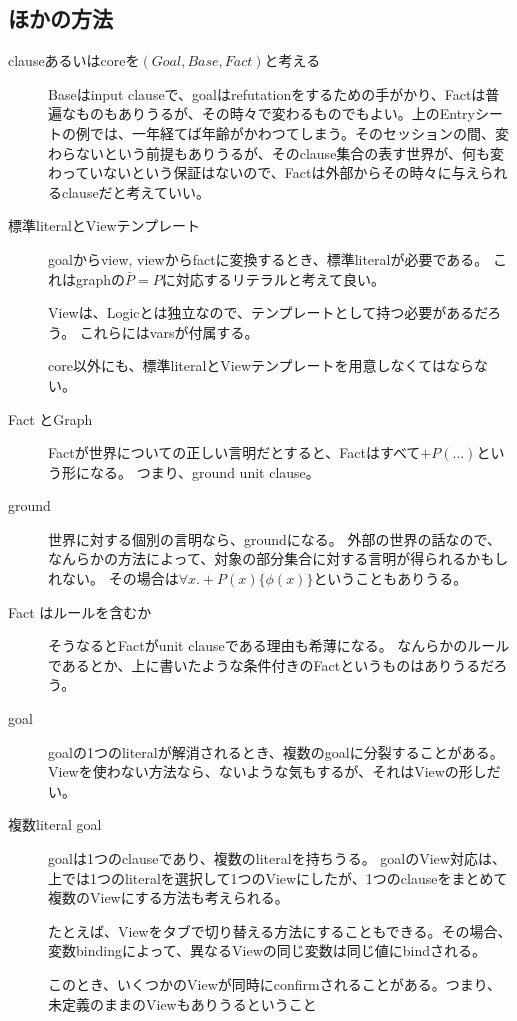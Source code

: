 \documentclass[10pt, onecolumn]{jarticle}   	%
\begin{document}
\subsection{ほかの方法}
\begin{description}
\item[ clauseあるいはcoreを$(Goal, Base, Fact)$と考える] 
Baseはinput clauseで、goalはrefutationをするための手がかり、Factは普遍なものもありうるが、その時々で変わるものでもよい。上のEntryシートの例では、一年経てば年齢がかわつてしまう。そのセッションの間、変わらないという前提もありうるが、そのclause集合の表す世界が、何も変わっていないという保証はないので、Factは外部からその時々に与えられるclauseだと考えていい。
\item[ 標準literalとViewテンプレート] goalからview, viewからfactに変換するとき、標準literalが必要である。
これはgraphの$\bar{P} = P$に対応するリテラルと考えて良い。

Viewは、Logicとは独立なので、テンプレートとして持つ必要があるだろう。
これらにはvarsが付属する。

core以外にも、標準literalとViewテンプレートを用意しなくてはならない。

\item[ Fact とGraph] Factが世界についての正しい言明だとすると、Factはすべて$+P(...)$という形になる。
つまり、ground unit clause。
\item[ ground ] 世界に対する個別の言明なら、groundになる。
外部の世界の話なので、なんらかの方法によって、対象の部分集合に対する言明が得られるかもしれない。
その場合は$\forall x. +P(x) \{\phi(x)\}$ということもありうる。
\item [ Fact はルールを含むか] そうなるとFactがunit clauseである理由も希薄になる。
なんらかのルールであるとか、上に書いたような条件付きのFactというものはありうるだろう。

\item[ goal ] goalの1つのliteralが解消されるとき、複数のgoalに分裂することがある。
Viewを使わない方法なら、ないような気もするが、それはViewの形しだい。

\item[ 複数literal goal ] goalは1つのclauseであり、複数のliteralを持ちうる。
goalのView対応は、上では1つのliteralを選択して1つのViewにしたが、1つのclauseをまとめて複数のViewにする方法も考えられる。

たとえば、Viewをタブで切り替える方法にすることもできる。その場合、変数bindingによって、異なるViewの同じ変数は同じ値にbindされる。

このとき、いくつかのViewが同時にconfirmされることがある。つまり、未定義のままのViewもありうるということ


\end{description}
\end{document}
